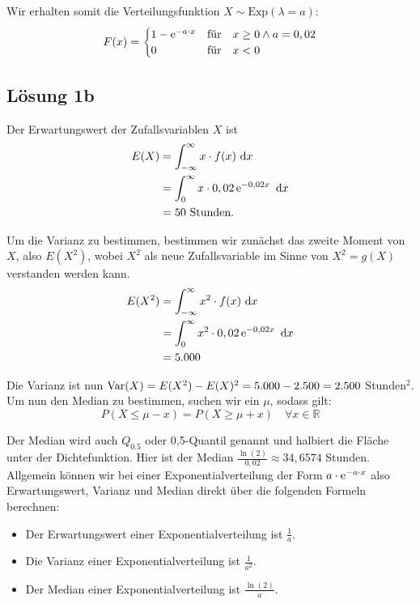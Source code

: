 \documentclass[main.tex]{subfiles}
\begin{document}
Wir erhalten somit die Verteilungsfunktion $X\sim \text{Exp}(\lambda = a)$:
$$
	F(x) = \begin{cases}
		1 - \operatorname{\mathrm{e}}^{-a\cdot x} & \text{für}\quad x\geq 0 \land a=0,02 \\
		0 & \text{für}\quad x < 0
	\end{cases}
$$

\subsection{Lösung 1b}

Der Erwartungswert der Zufallsvariablen $X$ ist
$$\begin{aligned}
	E(X) &= \int_{-\infty}^{\infty} x \cdot f(x) ~\mathrm{d}x \\
	&= \int_{0}^{\infty} x \cdot 0,02 \operatorname{\mathrm{e}}^{-0,02x} ~\mathrm{d}x \\
	&= 50\ \text{Stunden.}
\end{aligned}$$

Um die Varianz zu bestimmen, bestimmen wir zunächst das zweite Moment von $X$, also $E(X^2)$, wobei $X^2$ als neue Zufallsvariable im Sinne von $X^2=g(X)$ verstanden werden kann.
$$\begin{aligned}
	E(X^2) &= \int_{-\infty}^{\infty} x^2 \cdot f(x) ~\mathrm{d}x \\
	&= \int_{0}^{\infty} x^2 \cdot 0,02 \operatorname{\mathrm{e}}^{-0,02x} ~\mathrm{d}x \\
	&= 5.000
\end{aligned}$$

Die Varianz ist nun $\operatorname{Var}(X) = E(X^2)-E(X)^2 = 5.000 - 2.500 = 2.500$ Stunden$^2$.\\

Um nun den Median zu bestimmen, suchen wir ein $\mu$, sodass gilt:
$$
	P(X\leq \mu - x) = P(X\geq \mu +x) \quad \forall x\in\mathbb{R}
$$

Der Median wird auch $Q_{0.5}$ oder 0,5-Quantil genannt und halbiert die Fläche unter der Dichtefunktion. Hier ist der Median $\frac{\ln(2)}{0,02}\approx 34,6574$ Stunden.\\

Allgemein können wir bei einer Exponentialverteilung der Form $a\cdot \operatorname{\mathrm{e}}^{-a\cdot x}$ also Erwartungswert, Varianz und Median direkt über die folgenden Formeln berechnen:
\begin{itemize}
\item Der Erwartungswert einer Exponentialverteilung ist $\frac{1}{a}$.
\item Die Varianz einer Exponentialverteilung ist $\frac{1}{a^2}$.
\item Der Median einer Exponentialverteilung ist $\frac{\ln(2)}{a}$.
\end{itemize}
\end{document}
